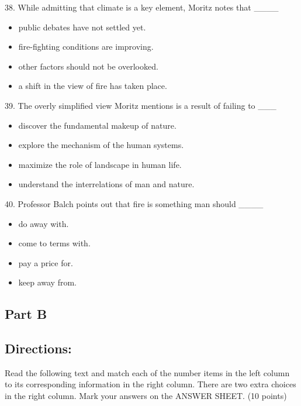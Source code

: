 \documentclass[UTF8,11pt]{ctexart}
\begin{document}
38. While admitting that climate is a key element, Moritz notes that \_\_\_\_


\begin{itemize}[leftmargin=2em,itemsep=.2em,topsep=.4em]\item[A.] public debates have not settled yet.
\item[B.] fire-fighting conditions are improving.
\item[C.] other factors should not be overlooked.
\item[D.] a shift in the view of fire has taken place.
\end{itemize}

39. The overly simplified view Moritz mentions is a result of failing to \_\_\_


\begin{itemize}[leftmargin=2em,itemsep=.2em,topsep=.4em]\item[A.] discover the fundamental makeup of nature.
\item[B.] explore the mechanism of the human systems.
\item[C.] maximize the role of landscape in human life.
\item[D.] understand the interrelations of man and nature.
\end{itemize}

40. Professor Balch points out that fire is something man should \_\_\_\_


\begin{itemize}[leftmargin=2em,itemsep=.2em,topsep=.4em]\item[A.] do away with.
\item[B.] come to terms with.
\item[C.] pay a price for.
\item[D.] keep away from.
\end{itemize}

\subsection*{\textbf{Part B}}


\subsection*{\textbf{Directions:}}


Read the following text and match each of the number items in the left column to its corresponding information in the right column. There are two extra choices in the right column. Mark your answers on the ANSWER SHEET. (10 points)
\end{document}
